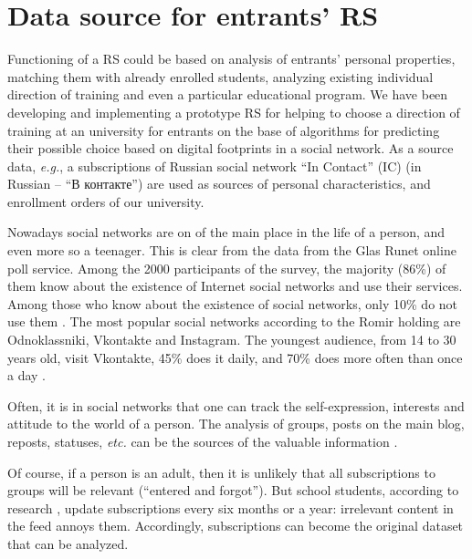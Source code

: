 \documentclass[conference]{IEEEtran}
\begin{document}
\section{Data source for entrants' RS}

Functioning of a RS could be based on analysis of entrants' personal properties, matching them with already enrolled students, analyzing existing individual direction of training and even a particular educational program.  We have been developing and implementing a prototype RS for helping to choose a direction of training at an university for entrants on the base of algorithms for predicting their possible choice based on digital footprints in a social network. As a source data, \emph{e.g.}, a subscriptions of Russian social network ``In Contact'' (IC) (in Russian -- ``В контакте'') are used as sources of personal characteristics, and enrollment orders of our university.  %

Nowadays social networks are on of the main place in the life of a person, and even more so a teenager.  This is clear from the data from the Glas Runet online poll service.  Among the 2000 participants of the survey, the majority (86\%) of them know about the existence of Internet social networks and use their services.  Among those who know about the existence of social networks, only 10\% do not use them \cite{c2}.
The most popular social networks according to the Romir holding are Odnoklassniki, Vkontakte and Instagram.  The youngest audience, from 14 to 30 years old, visit Vkontakte, 45\% does it daily, and 70\% does more often than once a day \cite{c6}.

Often, it is in social networks that one can track the self-expression, interests and attitude to the world of a person. The analysis of groups, posts on the main blog, reposts, statuses, \emph{etc.} can be the sources of the valuable information \cite{c7}.

Of course, if a person is an adult, then it is unlikely that all subscriptions to groups will be relevant (``entered and forgot'').  But school students, according to research \cite{c11}, update subscriptions every six months or a year: irrelevant content in the feed annoys them.  Accordingly, subscriptions can become the original dataset that can be analyzed.
\end{document}
